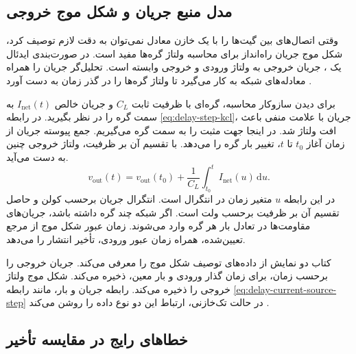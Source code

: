 \subsection{مدل منبع جریان و شکل موج خروجی}
\label{sec:delay-current-source}

وقتی اتصال‌های بین گیت‌ها را با یک خازن معادل نمی‌توان به
دقت لازم توصیف کرد، شکل موج جریان راه‌انداز برای محاسبه
ولتاژ گره‌ها مفید است. در صورت‌بندی ایدئال یک
، جریان خروجی به ولتاژ ورودی و
خروجی وابسته است. تحلیل‌گر جریان را همراه معادله‌های شبکه
 به کار می‌گیرد تا ولتاژ گره‌ها را در گذر زمان
به دست آورد \cite[بخش ، صفحه ۱۷۴]{weste}.

برای دیدن سازوکار محاسبه، گره‌ای با ظرفیت ثابت \(C_L\) و
جریان خالص \(I_{\mathrm{net}}(t)\) به سمت گره را در نظر
بگیرید. در رابطه \eqref{eq:delay-step-kcl}، جریان با علامت
منفی باعث افت ولتاژ شد. در اینجا جهت مثبت را به سمت گره
می‌گیریم. جمع پیوسته جریان از زمان آغاز \(t_0\) تا \(t\)،
تغییر بار گره را می‌دهد. با تقسیم آن بر ظرفیت، ولتاژ خروجی
چنین به دست می‌آید.
\begin{equation}
  v_{\mathrm{out}}(t)=v_{\mathrm{out}}(t_0)
    +\frac{1}{C_L}\int_{t_0}^{t} I_{\mathrm{net}}(u)\,\mathrm{d}u.
  \label{eq:delay-current-source-step}
\end{equation}
در این رابطه \(u\) متغیر زمان در انتگرال است. انتگرال
جریان برحسب کولن و حاصل تقسیم آن بر ظرفیت برحسب ولت است.
اگر شبکه چند گره داشته باشد، جریان‌های مقاومت‌ها در تعادل بار
هر گره وارد می‌شوند. زمان عبور شکل موج از مرجع تعیین‌شده،
همراه زمان عبور ورودی، تأخیر انتشار را می‌دهد.

کتاب دو نمایش از داده‌های توصیف شکل موج را معرفی می‌کند.
 جریان خروجی را
برحسب زمان، برای زمان گذار ورودی و بار معین، ذخیره می‌کند.
 شکل موج ولتاژ
خروجی را ذخیره می‌کند. رابطه جریان و بار، مانند رابطه
\eqref{eq:delay-current-source-step} در حالت تک‌خازنی، ارتباط
این دو نوع داده را روشن می‌کند
\cite[بخش ، صفحه ۱۷۴]{weste}.

\subsection{خطاهای رایج در مقایسه تأخیر}
\label{sec:delay-timing-pitfalls}

